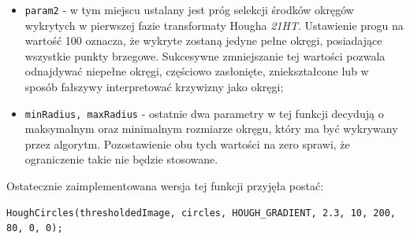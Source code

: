 \begin{itemize}
\item \texttt{param2} - w tym miejscu ustalany jest próg selekcji środków okręgów wykrytych w pierwszej fazie transformaty Hougha \textit{21HT}. Ustawienie progu na wartość 100 oznacza, że wykryte zostaną jedyne pełne okręgi, posiadające wszystkie punkty brzegowe. Sukcesywne zmniejszanie tej wartości pozwala odnajdywać niepełne okręgi, częściowo zasłonięte, zniekształcone lub w sposób fałszywy interpretować krzywizny jako okręgi;
\item \texttt{minRadius, maxRadius} - ostatnie dwa parametry w tej funkcji decydują o maksymalnym oraz minimalnym rozmiarze okręgu, który ma być wykrywany przez algorytm. Pozostawienie obu tych wartości na zero sprawi, że ograniczenie takie nie będzie stosowane.
\end{itemize}

Ostatecznie zaimplementowana wersja tej funkcji przyjęła postać:
\begin{lstlisting}[caption=Funckja realizująca transformację Hougha]
HoughCircles(thresholdedImage, circles, HOUGH_GRADIENT, 2.3, 10, 200, 80, 0, 0);
\end{lstlisting}

